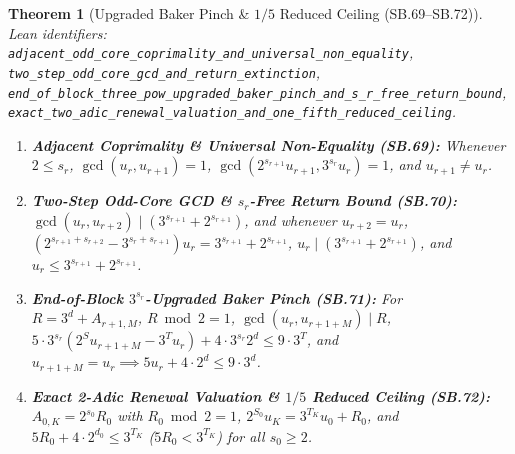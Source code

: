 \documentclass[11pt]{article}
\newtheorem{theorem}{Theorem}[section]
\begin{document}
\begin{theorem}[Upgraded Baker Pinch \& $1/5$ Reduced Ceiling (SB.69--SB.72)]
\emph{Lean identifiers:} \nolinkurl{adjacent_odd_core_coprimality_and_universal_non_equality}, \nolinkurl{two_step_odd_core_gcd_and_return_extinction}, \nolinkurl{end_of_block_three_pow_upgraded_baker_pinch_and_s_r_free_return_bound}, \nolinkurl{exact_two_adic_renewal_valuation_and_one_fifth_reduced_ceiling}.
\begin{enumerate}
  \item \textbf{Adjacent Coprimality \& Universal Non-Equality (SB.69):} Whenever $2 \le s_r$, $\gcd(u_r, u_{r+1}) = 1$, $\gcd(2^{s_{r+1}} u_{r+1}, 3^{s_r} u_r) = 1$, and $u_{r+1} \ne u_r$.
  \item \textbf{Two-Step Odd-Core GCD \& $s_r$-Free Return Bound (SB.70):} $\gcd(u_r, u_{r+2}) \mid (3^{s_{r+1}} + 2^{s_{r+1}})$, and whenever $u_{r+2} = u_r$, $(2^{s_{r+1}+s_{r+2}} - 3^{s_r+s_{r+1}}) u_r = 3^{s_{r+1}} + 2^{s_{r+1}}$, $u_r \mid (3^{s_{r+1}} + 2^{s_{r+1}})$, and $u_r \le 3^{s_{r+1}} + 2^{s_{r+1}}$.
  \item \textbf{End-of-Block $3^{s_r}$-Upgraded Baker Pinch (SB.71):} For $R = 3^d + A_{r+1, M}$, $R \bmod 2 = 1$, $\gcd(u_r, u_{r+1+M}) \mid R$, $5 \cdot 3^{s_r}(2^S u_{r+1+M} - 3^T u_r) + 4 \cdot 3^{s_r} 2^d \le 9 \cdot 3^T$, and $u_{r+1+M} = u_r \implies 5 u_r + 4 \cdot 2^d \le 9 \cdot 3^d$.
  \item \textbf{Exact 2-Adic Renewal Valuation \& $1/5$ Reduced Ceiling (SB.72):} $A_{0,K} = 2^{s_0} R_0$ with $R_0 \bmod 2 = 1$, $2^{S_0} u_K = 3^{T_K} u_0 + R_0$, and $5 R_0 + 4 \cdot 2^{d_0} \le 3^{T_K}$ ($5 R_0 < 3^{T_K}$) for all $s_0 \ge 2$.
\end{enumerate}
\end{theorem}
\end{document}
